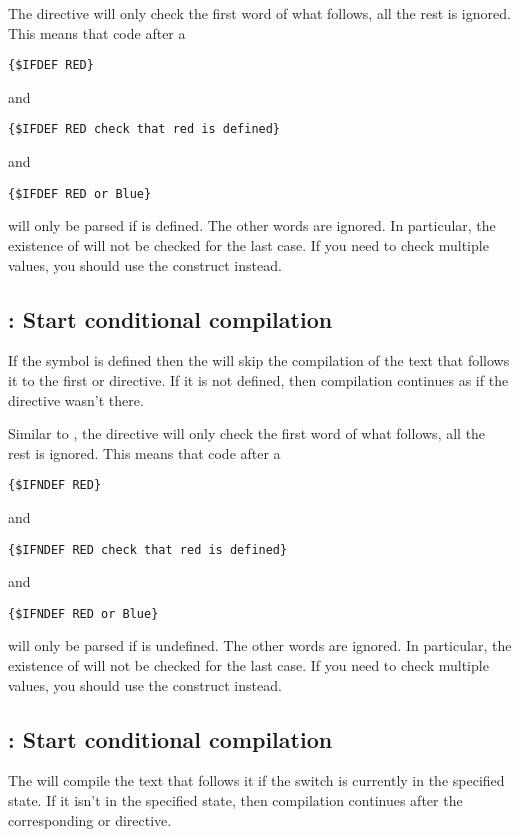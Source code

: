 The  directive will only check the first word of what follows,
all the rest is ignored. This means that code after a
\begin{verbatim}
{$IFDEF RED}
\end{verbatim}
and
\begin{verbatim}
{$IFDEF RED check that red is defined}
\end{verbatim}
and
\begin{verbatim}
{$IFDEF RED or Blue}
\end{verbatim}
will only be parsed if  is defined. The other words are ignored. In
particular, the existence of  will not be checked for the last case. 
If you need to check multiple values, you should use the  construct instead.

\subsection{ : Start conditional compilation}

If the symbol  is defined then the 
will skip the compilation of the text that follows it to the first
 or  directive.
If it is not defined, then compilation continues as if the directive
wasn't there.

Similar to , the   directive will only check the first word of what follows,
all the rest is ignored. This means that code after a
\begin{verbatim}
{$IFNDEF RED}
\end{verbatim}
and
\begin{verbatim}
{$IFNDEF RED check that red is defined}
\end{verbatim}
and
\begin{verbatim}
{$IFNDEF RED or Blue}
\end{verbatim}
will only be parsed if  is undefined. The other words are ignored. In
particular, the existence of  will not be checked for the last case. 
If you need to check multiple values, you should use the  construct instead.


\subsection{ : Start conditional compilation}

The  will compile the text that follows it if the
switch  is currently in the specified state.
If it isn't in the specified state, then compilation continues after the
corresponding  or  directive.

